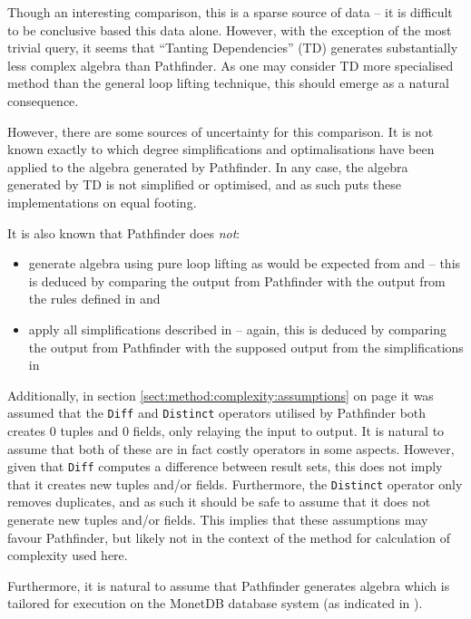 Though an interesting comparison, this is a sparse source of data -- it
is difficult to be conclusive based this data alone. However, with the
exception of the most trivial query, it seems that ``Tanting Dependencies'' (TD)
generates substantially less complex algebra than Pathfinder. As one
may consider TD more specialised method than the general loop lifting technique, this should
emerge as a natural consequence.

However, there are some sources of uncertainty for this comparison. It is not
known exactly to which degree simplifications and optimalisations have been
applied to the algebra generated by Pathfinder. In any case, the
algebra generated by TD is not simplified or optimised, and as such puts these
implementations on equal footing. 

It is also known that Pathfinder does \emph{not}:
\begin{itemize}
  \item generate algebra using pure loop lifting as would be expected from
  \cite{pathfinder_mothertongue} and \cite{pathfinder_purelyRelational} -- this
  is deduced by comparing the output from Pathfinder with the output
  from the rules defined in \cite{pathfinder_mothertongue} and
  \cite{pathfinder_purelyRelational}
  \item apply all simplifications described in
  \cite{pathfinder_purelyRelational} -- again, this is deduced by comparing the
  output from Pathfinder with the supposed output from the simplifications in
  \cite{pathfinder_purelyRelational}
\end{itemize}

Additionally, in section \ref{sect:method:complexity:assumptions} on page
\pageref{sect:method:complexity:assumptions} it was assumed that
the \texttt{Diff} and \texttt{Distinct} operators utilised by Pathfinder both
creates 0 tuples and 0 fields, only relaying the input to output. It is
natural to assume that both of these are in fact costly operators in some
aspects. However, given that \texttt{Diff} computes a difference between
result sets, this does not imply that it creates new tuples and/or fields.
Furthermore, the \texttt{Distinct} operator only removes duplicates, and as
such it should be safe to assume that it does not generate new tuples and/or
fields. This implies that these assumptions may favour Pathfinder, but likely
not in the context of the method for calculation of complexity used here.

Furthermore, it is natural to assume that Pathfinder generates algebra
which is tailored for execution on the MonetDB database system (as indicated
in \cite{pathfinder_purelyRelational}).

